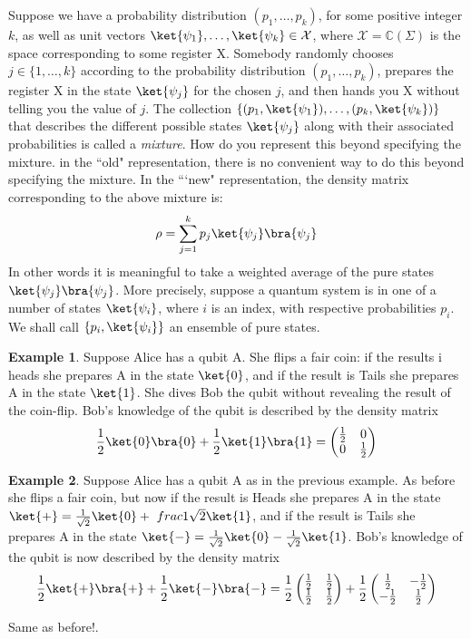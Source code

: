 \documentclass[12pt, oneside]{book}
\theoremstyle{definition}
\theoremstyle{definition}
\newtheorem{example}{Example}[section]
\theoremstyle{remark}
\begin{document}
Suppose we have a probability distribution $(p_1,\ldots,p_k)$, for some positive integer $k$, as well as unit vectors $\ket{\psi_1},\ldots,\ket{\psi_k} \in \mathcal{X}$, where $\mathcal{X}=\mathbb{C}(\Sigma)$ is the space corresponding to some register X. Somebody randomly chooses $j \in \{1,\ldots,k\}$ according to the probability distribution $(p_1,\ldots,p_k)$, prepares the register X in the state $\ket{\psi_j}$ for the chosen $j$, and then hands you X without telling you the value of $j$. The collection $\{(p_1,\ket{\psi_1}),\ldots,(p_k,\ket{\psi_k})\}$ that describes the different possible states $\ket{\psi_j}$ along with their associated probabilities is called a \textit{mixture}. How do you represent this beyond specifying the mixture. in the ``old" representation, there is no convenient way to do this beyond specifying the mixture. In the ```new" representation, the density matrix corresponding to the above mixture is:
\[
\rho=\sum_{j=1}^k p_j \ket{\psi_j}\bra{\psi_j}
\]
In other words it is meaningful to take a weighted average of the pure states $\ket{\psi_j}\bra{\psi_j}$. More precisely, suppose a quantum system is in one of a number of states $\ket{\psi_i}$, where $i$ is an index, with respective probabilities $p_i$. We shall call $\{p_i,\ket{\psi_i}\}$ an ensemble of pure states.
\begin{example}
    Suppose Alice has a qubit A. She flips a fair coin: if the results i heads she prepares A in the state $\ket{0}$, and if the result is Tails she prepares A in the state $\ket{1}$. She dives Bob the qubit without revealing the result of the coin-flip. Bob's knowledge of the qubit is described by the density matrix
    \[
    \frac{1}{2}\ket{0}\bra{0}+ \frac{1}{2}\ket{1}\bra{1} = \begin{pmatrix} \frac{1}{2} & 0 \\ 0 & \frac{1}{2} \end{pmatrix} 
    \]
\end{example}
\begin{example}
    Suppose Alice has a qubit A as in the previous example. As before she flips a fair coin, but now if the result is Heads she prepares A in the state $\ket{+}=\frac{1}{\sqrt{2}} \ket{0} +\ frac{1}{\sqrt{2}}\ket{1}$, and if the result is Tails she prepares A in the state $\ket{-}=\frac{1}{\sqrt{2}}\ket{0}-\frac{1}{\sqrt{2}}\ket{1}$. Bob's knowledge of the qubit is now described by the density matrix
    \[
        \frac{1}{2}\ket{+}\bra{+} + \frac{1}{2}\ket{-}\bra{-} = \frac{1}{2}\begin{pmatrix} \frac{1}{2} & \frac{1}{2} \\ \frac{1}{2} & \frac{1}{2} \end{pmatrix}  + \frac{1}{2} \begin{pmatrix}  \frac{1}{2} & -\frac{1}{2} \\ -\frac{1}{2} & \frac{1}{2} \end{pmatrix}
    \]
\end{example}
Same as before!.
\end{document}
